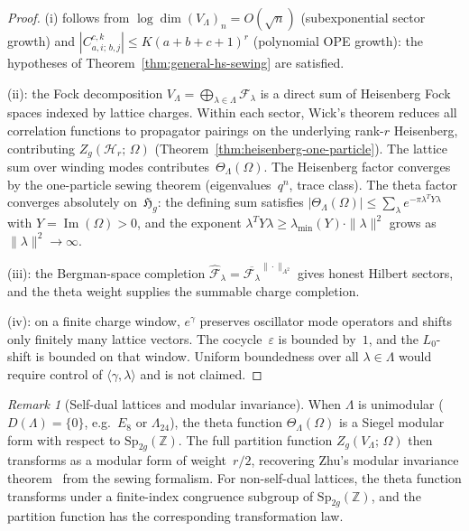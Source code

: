 \documentclass[11pt,reqno]{amsart}
\theoremstyle{definition}
\theoremstyle{remark}
\newtheorem{remark}[theorem]{Remark}
\newcommand{\cF}{\mathcal{F}}
\newcommand{\cH}{\mathcal{H}}
\newcommand{\bZ}{\mathbb{Z}}
\newcommand{\fH}{\mathfrak{H}}
\numberwithin{equation}{section}
\begin{document}
\begin{proof}
(i) follows from
$\log\dim(V_\Lambda)_n = O(\sqrt{n})$ (subexponential sector
growth) and $|C^{c,k}_{a,i;\,b,j}| \leq K(a+b+c+1)^r$
(polynomial OPE growth): the hypotheses of
Theorem~\ref{thm:general-hs-sewing} are satisfied.

(ii): the Fock decomposition
$V_\Lambda = \bigoplus_{\lambda\in\Lambda} \cF_\lambda$ is a direct
sum of Heisenberg Fock spaces indexed by lattice charges. Within
each sector, Wick's
theorem reduces all correlation functions to propagator
pairings on the underlying rank-$r$ Heisenberg, contributing
$Z_g(\cH_r;\,\Omega)$
(Theorem~\ref{thm:heisenberg-one-particle}).  The lattice sum
over winding modes contributes~$\Theta_\Lambda(\Omega)$.  The
Heisenberg factor converges by the one-particle sewing theorem
(eigenvalues~$q^n$, trace class).  The theta factor converges
absolutely on~$\fH_g$: the defining sum satisfies
$|\Theta_\Lambda(\Omega)|
\leq \sum_\lambda e^{-\pi\lambda^T Y\lambda}$
with $Y = \operatorname{Im}(\Omega) > 0$, and the exponent
$\lambda^T Y\lambda
\geq \lambda_{\min}(Y) \cdot \|\lambda\|^2$
grows as $\|\lambda\|^2 \to \infty$.

(iii): the Bergman-space completion
$\widehat{\cF}_\lambda
= \overline{\cF_\lambda}^{\|\cdot\|_{A^2}}$
gives honest Hilbert sectors, and the theta weight supplies the
summable charge completion.

(iv): on a finite charge window, $e^\gamma$ preserves oscillator
mode operators and shifts only finitely many lattice vectors. The
cocycle~$\varepsilon$ is bounded by~$1$, and the $L_0$-shift is
bounded on that window. Uniform boundedness over all $\lambda\in
\Lambda$ would require control of
$\langle\gamma,\lambda\rangle$ and is not claimed.
\end{proof}

\begin{remark}[Self-dual lattices and modular
 invariance]\label{rem:self-dual}
When $\Lambda$ is unimodular
($D(\Lambda) = \{0\}$, e.g.\ $E_8$ or
$\Lambda_{24}$), the theta function
$\Theta_\Lambda(\Omega)$ is a Siegel modular form with
respect to $\mathrm{Sp}_{2g}(\bZ)$.  The full partition
function $Z_g(V_\Lambda;\,\Omega)$ then transforms as a
modular form of weight~$r/2$, recovering Zhu's modular
invariance theorem~\cite{Zhu96} from the sewing formalism.
For non-self-dual lattices, the theta function transforms
under a finite-index congruence subgroup of
$\mathrm{Sp}_{2g}(\bZ)$, and the partition function has the
corresponding transformation law.
\end{remark}
\end{document}
